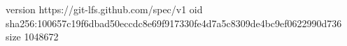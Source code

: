 version https://git-lfs.github.com/spec/v1
oid sha256:100657c19f6dbad50eccdc8e69f917330fe4d7a5c8309de4bc9ef0622990d736
size 1048672
